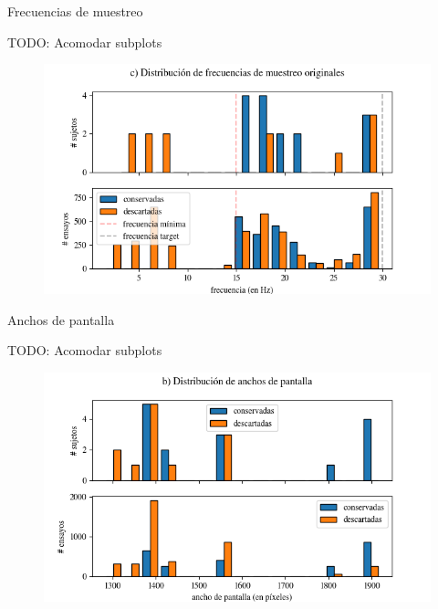 \documentclass[aspectratio=169]{beamer}
\begin{document}
\begin{frame}{Frecuencias de muestreo}

  TODO: Acomodar subplots
  \begin{figure}
    \includegraphics[width=0.7\linewidth]{img/second-sampling-frequencies-distribution.png}
  \end{figure}

\end{frame}

\begin{frame}{Anchos de pantalla}

  TODO: Acomodar subplots
  \begin{figure}
    \includegraphics[width=0.7\linewidth]{img/second-widths-distribution.png}
  \end{figure}

\end{frame}
\end{document}
